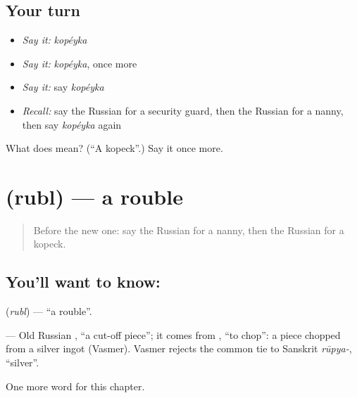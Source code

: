 \subsection*{Your turn}
\begin{itemize}
\raggedright
  \item \emph{Say it:} \emph{kopéyka}
  \item \emph{Say it:} \emph{kopéyka}, once more
  \item \emph{Say it:} say \emph{kopéyka}
  \item \emph{Recall:} say the Russian for a security guard, then the Russian for a nanny, then say \emph{kopéyka} again
\end{itemize}

\begin{tcolorbox}[breakable,colback=teal!4,colframe=teal!35!black,title={Before you move on}]
What does  mean? (\textquotedblleft{}A kopeck\textquotedblright{}.) Say it once more.
\end{tcolorbox}
\section[\texorpdfstring{\ru{рубль} (rubl)}{рубль (rubl)}]{ (rubl) — a rouble}

\label{lesson:RU-C231-rubl}



\begin{quote}
Before the new one: say the Russian for a nanny, then the Russian for a kopeck.
\end{quote}

\subsection*{You'll want to know: }
\textbf{} (\emph{rubl}) — \textquotedblleft{}a rouble\textquotedblright{}.

\begin{cousinweb}
\textbf{} — Old Russian \emph{}, \textquotedblleft{}a cut-off piece\textquotedblright{}; it comes from \emph{}, \textquotedblleft{}to chop\textquotedblright{}: a piece chopped from a silver ingot (Vasmer). Vasmer rejects the common tie to Sanskrit \emph{rūpya-}, \textquotedblleft{}silver\textquotedblright{}.
\end{cousinweb}

\begin{grammarlens}[title={What you've built}]
One more word for this chapter.
\end{grammarlens}

